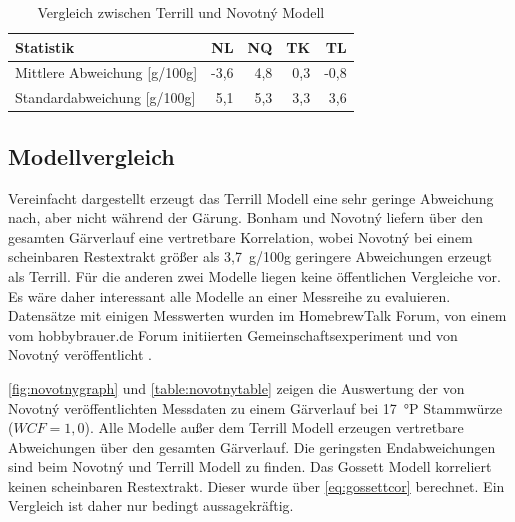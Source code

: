 \documentclass[a4paper,parskip=half]{scrartcl}
\newcommand{\wcf}{\mathit{WCF}}
\begin{document}
\begin{table}[h]
\centering
\begin{tabular}{lrrrr}
\toprule
Statistik & NL & NQ & TK & TL \\
\midrule
Mittlere Abweichung [g/100g] & -3,6 & 4,8 & 0,3 & -0,8 \\
Standardabweichung [g/100g] & 5,1 & 5,3 & 3,3 & 3,6 \\
\bottomrule
\end{tabular}
\caption{Vergleich zwischen Terrill und Novotný Modell}
\label{table:terrillnovotnycomp}
\end{table}

\subsection*{Modellvergleich}

Vereinfacht dargestellt erzeugt das Terrill Modell eine sehr geringe
Abweichung nach, aber nicht während der Gärung. Bonham und Novotný
liefern über den gesamten Gärverlauf eine vertretbare Korrelation,
wobei Novotný bei einem scheinbaren Restextrakt größer als 3,7~g/100g
geringere Abweichungen erzeugt als Terrill. Für die anderen zwei Modelle
liegen keine öffentlichen Vergleiche vor. Es wäre daher interessant
alle Modelle an einer Messreihe zu evaluieren. Datensätze mit einigen
Messwerten wurden im HomebrewTalk Forum, von einem vom hobbybrauer.de Forum
initiierten Gemeinschaftsexperiment und von Novotný veröffentlicht
\autocite{Novotny2017a,Katman2019,Wolf2015}.

\autoref{fig:novotnygraph} und \autoref{table:novotnytable} zeigen die
Auswertung der von Novotný veröffentlichten Messdaten zu einem
Gärverlauf bei 17~°P Stammwürze ($\wcf = 1,0$). Alle Modelle außer dem
Terrill Modell erzeugen vertretbare Abweichungen über den gesamten
Gärverlauf. Die geringsten Endabweichungen sind beim Novotný und Terrill
Modell zu finden. Das Gossett Modell korreliert keinen scheinbaren Restextrakt.
Dieser wurde über \autoref{eq:gossettcor} berechnet. Ein Vergleich
ist daher nur bedingt aussagekräftig.
\end{document}
